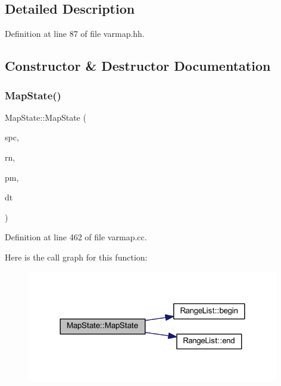 \subsection{Detailed Description}


Definition at line 87 of file varmap.\+hh.



\subsection{Constructor \& Destructor Documentation}
\mbox{\label{class_map_state_a0f570a682e1cadffc4b60a8fd50837cf}} 
\subsubsection{\texorpdfstring{MapState()}{MapState()}}
{\footnotesize\ttfamily Map\+State\+::\+Map\+State (\begin{DoxyParamCaption}\item[{\mbox{\hyperlink{class_addr_space}{Addr\+Space}} $\ast$}]{spc,  }\item[{const \mbox{\hyperlink{class_range_list}{Range\+List}} \&}]{rn,  }\item[{const \mbox{\hyperlink{class_range_list}{Range\+List}} \&}]{pm,  }\item[{\mbox{\hyperlink{class_datatype}{Datatype}} $\ast$}]{dt }\end{DoxyParamCaption})}



Definition at line 462 of file varmap.\+cc.

Here is the call graph for this function\+:
\nopagebreak
\begin{figure}[H]
\begin{center}
\leavevmode
\includegraphics[width=312pt]{class_map_state_a0f570a682e1cadffc4b60a8fd50837cf_cgraph}
\end{center}
\end{figure}
\mbox{\label{class_map_state_a39729b68f74a378c3a0fda232bbc1500}} 

